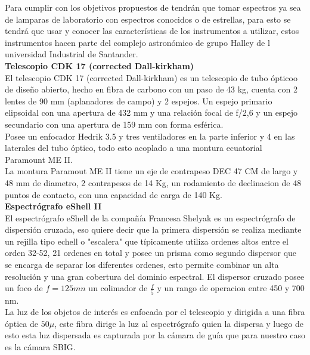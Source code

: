  \noindent Para cumplir con los objetivos propuestos de tendrán que tomar espectros ya sea de lamparas de laboratorio con espectros conocidos o de estrellas, para esto se tendrá que usar y conocer las características de los instrumentos a utilizar, estos instrumentos hacen parte del complejo astronómico de grupo Halley de l universidad Industrial de Santander.\\

\noindent \textbf{ Telescopio CDK 17 (corrected Dall-kirkham)}\\

\noindent El telescopio CDK 17 (corrected Dall-kirkham) es un telescopio de tubo ópticoo de diseño abierto, hecho en fibra de carbono con un paso de 43 kg, cuenta con 2 lentes de 90 mm (aplanadores de campo) y 2 espejos. 
Un espejo primario elipsoidal con una apertura de 432 mm y una relación focal de f/2,6 y un espejo secundario con una apertura de 159 mm con forma esférica.\\
Posee un enfocador Hedrik 3.5 y tres ventiladores en la parte inferior y 4 en las laterales del tubo óptico, todo esto acoplado a una montura ecuatorial Paramount ME II.\\
La montura Paramout ME II tiene un eje de contrapeso DEC 47 CM  de largo y 48 mm de diametro, 2 contrapesos de 14 Kg, un rodamiento de declinacion de 48 puntos de contacto, con una capacidad de carga de 140 Kg.\\


\noindent \textbf{Espectrógrafo  eShell II }\\

El espectrógrafo eShell de la compañía Francesa Shelyak es un espectrógrafo de dispersión cruzada, eso quiere decir que la primera dispersión se realiza mediante un rejilla tipo echell  o "escalera" que típicamente utiliza ordenes altos entre el orden 32-52, 21 ordenes en total y posee un prisma como segundo dispersor que se encarga de separar los diferentes ordenes, esto permite combinar un alta resolución y una gran cobertura del dominio espectral.
El dispersor cruzado posee un foco de $f=125 mn$ un colimador de $\frac{f}{5}$ y un rango de operacion entre 450 y 700 nm.\\
La luz de los objetos de interés es enfocada por el telescopio y dirigida a una fibra óptica de $50\mu$, este fibra dirige la luz al espectrógrafo quien la dispersa y luego de esto esta luz dispersada es capturada por la cámara de guía que para nuestro caso es la cámara SBIG.\cite{echell}\\


